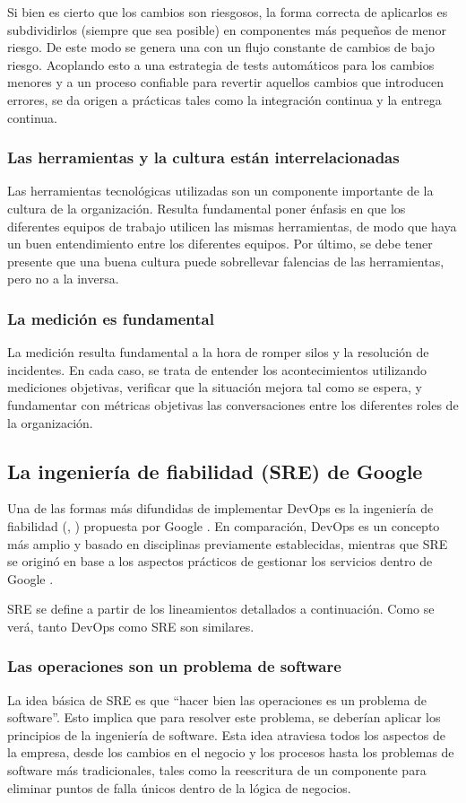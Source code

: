 Si bien es cierto que los cambios son riesgosos, la forma correcta de
aplicarlos es subdividirlos (siempre que sea posible) en componentes
más pequeños de menor riesgo. De este modo se genera una 
con un flujo constante de cambios de bajo riesgo. Acoplando esto a una
estrategia de tests automáticos para los cambios menores y a un
proceso confiable para revertir aquellos cambios que introducen
errores, se da origen a prácticas tales como la integración continua y
la entrega continua.
%
\subsubsection{Las herramientas y la cultura están interrelacionadas}
%
Las herramientas tecnológicas utilizadas son un componente importante
de la cultura de la organización. Resulta fundamental poner énfasis en
que los diferentes equipos de trabajo utilicen las mismas
herramientas, de modo que haya un buen entendimiento entre los
diferentes equipos. Por último, se debe tener presente que una buena
cultura puede sobrellevar falencias de las herramientas, pero no a la
inversa.
%
\subsubsection{La medición es fundamental}
%
La medición resulta fundamental a la hora de romper silos y la
resolución de incidentes. En cada caso, se trata de entender los
acontecimientos utilizando mediciones objetivas, verificar que la
situación mejora tal como se espera, y fundamentar con métricas
objetivas las conversaciones entre los diferentes roles de la
organización.
%
\subsection{La ingeniería de fiabilidad (SRE) de Google}
%
Una de las formas más difundidas de implementar DevOps es la
ingeniería de fiabilidad (, )
propuesta por Google \cite{sre}. En comparación, DevOps es un concepto
más amplio y basado en disciplinas previamente establecidas, mientras
que SRE se originó en base a los aspectos prácticos de gestionar los
servicios dentro de Google \cite{workbook}.

SRE se define a partir de los lineamientos detallados a
continuación. Como se verá, tanto DevOps como SRE son similares.
%
\subsubsection{Las operaciones son un problema de software}
%
La idea básica de SRE es que ``hacer bien las operaciones es un
problema de software''. Esto implica que para resolver este problema,
se deberían aplicar los principios de la ingeniería de software. Esta
idea atraviesa todos los aspectos de la empresa, desde los cambios en
el negocio y los procesos hasta los problemas de software más
tradicionales, tales como la reescritura de un componente para
eliminar puntos de falla únicos dentro de la lógica de negocios.
%
